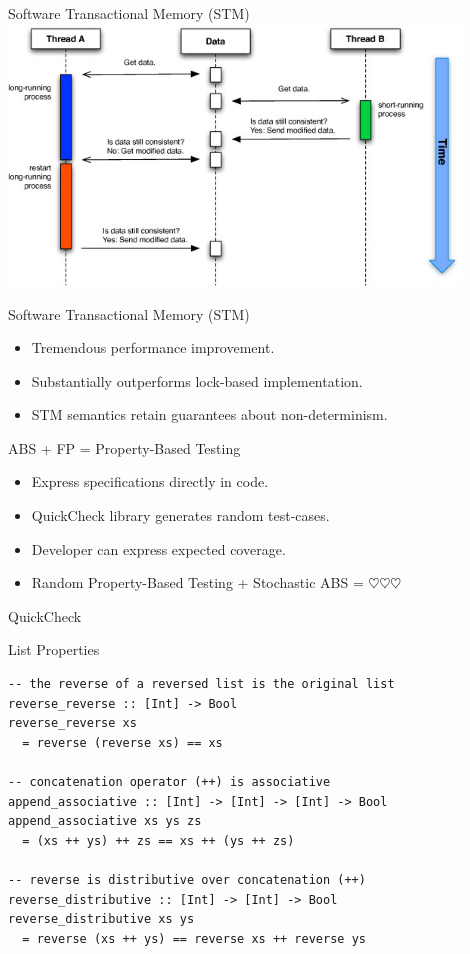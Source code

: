 \documentclass{beamer} %
\begin{document}
\begin{frame}{Software Transactional Memory (STM)}
  \includegraphics[width=0.9\textwidth]{./fig/stm.png}
\end{frame}

\begin{frame}{Software Transactional Memory (STM)}
  \begin{itemize}
  	\item Tremendous performance improvement.
    \item Substantially outperforms lock-based implementation.
    \item STM semantics retain guarantees about non-determinism.
  \end{itemize}
\end{frame}

\begin{frame}{ABS + FP = Property-Based Testing}
  \begin{itemize}
    \item Express specifications directly in code.
    \item QuickCheck library generates random test-cases.
    \item Developer can express expected coverage.
    \item Random Property-Based Testing + Stochastic ABS = $\heartsuit \heartsuit \heartsuit$
  \end{itemize}
\end{frame}

\begin{frame}[fragile]{QuickCheck}
\begin{block}{List Properties}
\begin{verbatim}
-- the reverse of a reversed list is the original list
reverse_reverse :: [Int] -> Bool
reverse_reverse xs 
  = reverse (reverse xs) == xs

-- concatenation operator (++) is associative
append_associative :: [Int] -> [Int] -> [Int] -> Bool
append_associative xs ys zs 
  = (xs ++ ys) ++ zs == xs ++ (ys ++ zs)

-- reverse is distributive over concatenation (++)
reverse_distributive :: [Int] -> [Int] -> Bool
reverse_distributive xs ys 
  = reverse (xs ++ ys) == reverse xs ++ reverse ys
\end{verbatim}
\end{block}
\end{frame}
\end{document}
